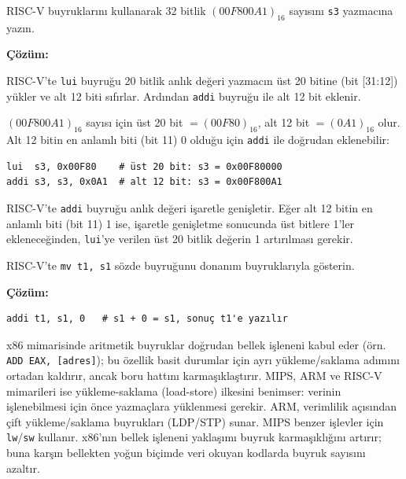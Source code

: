 \begin{ornek}[3.8]
RISC-V buyruklarını kullanarak 32 bitlik $(00F800A1)_{16}$ sayısını \texttt{s3} yazmacına yazın.

\textbf{Çözüm:}

RISC-V'te \texttt{lui} buyruğu 20 bitlik anlık değeri yazmacın üst 20 bitine (bit [31:12]) yükler ve alt 12 biti sıfırlar. Ardından \texttt{addi} buyruğu ile alt 12 bit eklenir.

$(00F800A1)_{16}$ sayısı için üst 20 bit $= (00F80)_{16}$, alt 12 bit $= (0A1)_{16}$ olur. Alt 12 bitin en anlamlı biti (bit 11) 0 olduğu için \texttt{addi} ile doğrudan eklenebilir:

\begin{lstlisting}[style=riscv]
lui  s3, 0x00F80    # üst 20 bit: s3 = 0x00F80000
addi s3, s3, 0x0A1  # alt 12 bit: s3 = 0x00F800A1
\end{lstlisting}

\begin{bilginot}
RISC-V'te \texttt{addi} buyruğu anlık değeri işaretle genişletir. Eğer alt 12 bitin en anlamlı biti (bit 11) 1 ise, işaretle genişletme sonucunda üst bitlere 1'ler ekleneceğinden, \texttt{lui}'ye verilen üst 20 bitlik değerin 1 artırılması gerekir.
\end{bilginot}
\end{ornek}

\begin{ornek}[3.9]
RISC-V'te \texttt{mv t1, s1} sözde buyruğunu donanım buyruklarıyla gösterin.

\textbf{Çözüm:}
\begin{lstlisting}[style=riscv]
addi t1, s1, 0   # s1 + 0 = s1, sonuç t1'e yazılır
\end{lstlisting}
\end{ornek}


\begin{karsilastirma}
x86 mimarisinde aritmetik buyruklar doğrudan bellek işleneni kabul eder (örn. \texttt{ADD EAX, [adres]}); bu özellik basit durumlar için ayrı yükleme/saklama adımını ortadan kaldırır, ancak boru hattını karmaşıklaştırır. MIPS, ARM ve RISC-V mimarileri ise yükleme-saklama (load-store) ilkesini benimser: verinin işlenebilmesi için önce yazmaçlara yüklenmesi gerekir. ARM, verimlilik açısından çift yükleme/saklama buyrukları (LDP/STP) sunar. MIPS benzer işlevler için \texttt{lw}/\texttt{sw} kullanır. x86'nın bellek işleneni yaklaşımı buyruk karmaşıklığını artırır; buna karşın bellekten yoğun biçimde veri okuyan kodlarda buyruk sayısını azaltır.
\end{karsilastirma}

